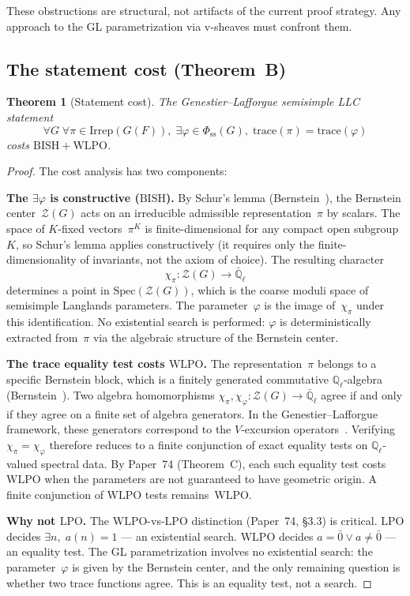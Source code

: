 \documentclass[12pt, a4paper]{article}
\theoremstyle{plain}
\newtheorem{theorem}{Theorem}[section]
\theoremstyle{definition}
\theoremstyle{remark}
\newcommand{\BISH}{\mathrm{BISH}}
\newcommand{\WLPO}{\mathrm{WLPO}}
\newcommand{\LPO}{\mathrm{LPO}}
\newcommand{\Qell}{\mathbb{Q}_\ell}
\begin{document}
These obstructions are structural, not artifacts of the current proof
strategy.  Any approach to the GL parametrization via v-sheaves must
confront them.

\subsection{The statement cost (Theorem~B)}\label{sec:statement}

\begin{theorem}[Statement cost]\label{thm:statement-cost}
The Genestier--Lafforgue semisimple LLC statement
\[
  \forall G\;\forall \pi \in \mathrm{Irrep}(G(F)),\;
  \exists \varphi \in \Phi_{\mathrm{ss}}(G),\;
  \mathrm{trace}(\pi) = \mathrm{trace}(\varphi)
\]
costs $\BISH + \WLPO$.
\end{theorem}

\begin{proof}
The cost analysis has two components:

\medskip\noindent\textbf{The $\exists\varphi$ is constructive ($\BISH$).}
By Schur's lemma (Bernstein~\cite{bernstein}), the Bernstein
center~$\mathcal{Z}(G)$ acts on an irreducible admissible
representation~$\pi$ by scalars.  The space of $K$-fixed
vectors~$\pi^K$ is finite-dimensional for any compact open
subgroup~$K$, so Schur's lemma applies constructively (it requires
only the finite-dimensionality of invariants, not the axiom of
choice).  The resulting character
\[
  \chi_\pi \colon \mathcal{Z}(G) \to \bar{\mathbb{Q}}_\ell
\]
determines a point in $\mathrm{Spec}(\mathcal{Z}(G))$, which is the
coarse moduli space of semisimple Langlands parameters.  The
parameter~$\varphi$ is the image of~$\chi_\pi$ under this
identification.  No existential search is performed: $\varphi$ is
deterministically extracted from~$\pi$ via the algebraic structure
of the Bernstein center.

\medskip\noindent\textbf{The trace equality test costs $\WLPO$.}
The representation~$\pi$ belongs to a specific Bernstein block,
which is a finitely generated commutative $\Qell$-algebra
(Bernstein~\cite{bernstein}).  Two algebra homomorphisms
$\chi_\pi, \chi_\varphi \colon \mathcal{Z}(G) \to \bar{\mathbb{Q}}_\ell$
agree if and only if they agree on a finite set of algebra generators.
In the Genestier--Lafforgue framework, these generators correspond
to the $V$-excursion operators~\cite{genestier-lafforgue}.
Verifying $\chi_\pi = \chi_\varphi$ therefore reduces to a finite
conjunction of exact equality tests on $\Qell$-valued spectral
data.  By Paper~74 (Theorem~C), each such equality test costs
$\WLPO$ when the parameters are not guaranteed to have geometric
origin.  A finite conjunction of $\WLPO$ tests remains~$\WLPO$.

\medskip\noindent\textbf{Why not $\LPO$.}
The $\WLPO$-vs-$\LPO$ distinction (Paper~74, \S 3.3) is critical.
$\LPO$ decides $\exists n,\; a(n) = 1$ --- an existential search.
$\WLPO$ decides $a = \bar{0} \lor a \neq \bar{0}$ --- an equality
test.  The GL parametrization involves no existential search: the
parameter~$\varphi$ is given by the Bernstein center, and the only
remaining question is whether two trace functions agree.  This is
an equality test, not a search.
\end{proof}
\end{document}
